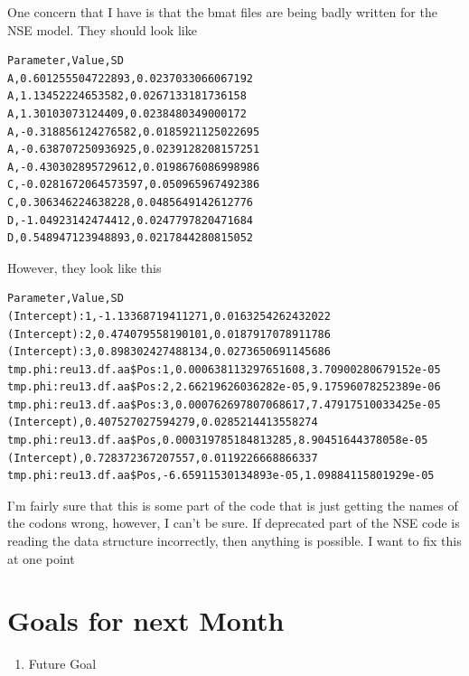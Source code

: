 One concern that I have is that the bmat files are being badly written for the NSE model. They should look like 

\begin{verbatim}
Parameter,Value,SD
A,0.601255504722893,0.0237033066067192
A,1.13452224653582,0.0267133181736158
A,1.30103073124409,0.0238480349000172
A,-0.318856124276582,0.0185921125022695
A,-0.638707250936925,0.0239128208157251
A,-0.430302895729612,0.0198676086998986
C,-0.0281672064573597,0.050965967492386
C,0.306346224638228,0.0485649142612776
D,-1.04923142474412,0.0247797820471684
D,0.548947123948893,0.0217844280815052
\end{verbatim}

However, they look like this

\begin{verbatim}
Parameter,Value,SD
(Intercept):1,-1.13368719411271,0.0163254262432022
(Intercept):2,0.474079558190101,0.0187917078911786
(Intercept):3,0.898302427488134,0.0273650691145686
tmp.phi:reu13.df.aa$Pos:1,0.000638113297651608,3.70900280679152e-05
tmp.phi:reu13.df.aa$Pos:2,2.66219626036282e-05,9.17596078252389e-06
tmp.phi:reu13.df.aa$Pos:3,0.000762697807068617,7.47917510033425e-05
(Intercept),0.407527027594279,0.0285214413558274
tmp.phi:reu13.df.aa$Pos,0.000319785184813285,8.90451644378058e-05
(Intercept),0.728372367207557,0.0119226668866337
tmp.phi:reu13.df.aa$Pos,-6.65911530134893e-05,1.09884115801929e-05
\end{verbatim}


I'm fairly sure that this is some part of the code that is just getting the names of the codons wrong, however, I can't be sure. If deprecated part of the NSE code is reading the data structure incorrectly, then anything is possible. I want to fix this at one point




\section{Goals for next Month}
\begin{enumerate}
\item Future Goal
\end{enumerate}


